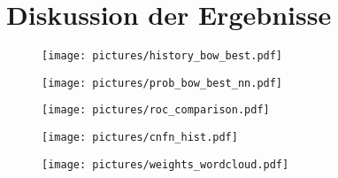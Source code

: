 \chapter{Diskussion der Ergebnisse}

\begin{figure}
    \centering
    \texttt{[image: pictures/history\_bow\_best.pdf]}
    \caption{}
    \label{fig:history}
\end{figure}

\begin{figure}
    \centering
    \texttt{[image: pictures/prob\_bow\_best\_nn.pdf]}
    \caption{}
    \label{fig:likelihood}
\end{figure}

\begin{figure}
    \centering
    \texttt{[image: pictures/roc\_comparison.pdf]}
    \caption{}
    \label{fig:likelihood}
\end{figure}

\begin{figure}
    \centering
    \texttt{[image: pictures/cnfn\_hist.pdf]}
    \caption{}
    \label{fig:cnfn_hist}
\end{figure}
\begin{figure}
    \centering
    \texttt{[image: pictures/weights\_wordcloud.pdf]}
    \caption{}
    \label{fig:weights}
\end{figure}

